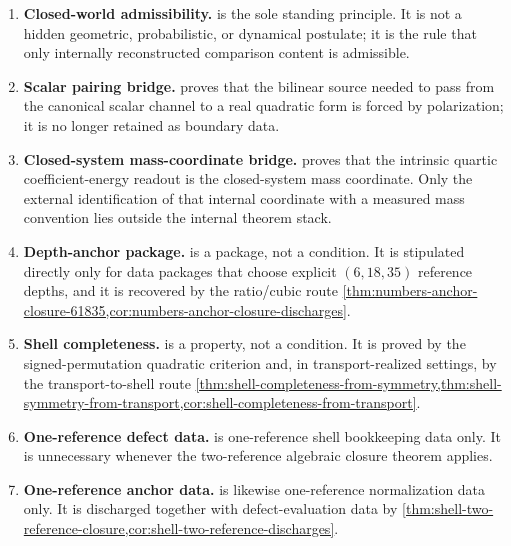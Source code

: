 \begin{enumerate}[label=\textup{(H\arabic*)}]
\item
  \textbf{Closed-world admissibility.}
   is the sole standing principle.  It is not a hidden
  geometric, probabilistic, or dynamical postulate; it is the rule that only
  internally reconstructed comparison content is admissible.
\item
  \textbf{Scalar pairing bridge.}
   proves that the bilinear source needed to pass
  from the canonical scalar channel to a real quadratic form is forced by
  polarization; it is no longer retained as boundary data.
\item
  \textbf{Closed-system mass-coordinate bridge.}
   proves that the intrinsic quartic
  coefficient-energy readout is the closed-system mass coordinate.  Only the
  external identification of that internal coordinate with a measured mass
  convention lies outside the internal theorem stack.
\item
  \textbf{Depth-anchor package.}
   is a package, not a condition.  It is
  stipulated directly only for data packages that choose explicit \((6,18,35)\)
  reference depths, and it is recovered by the ratio/cubic route
  \cref{thm:numbers-anchor-closure-61835,cor:numbers-anchor-closure-discharges}.
\item
  \textbf{Shell completeness.}
   is a property, not a condition.  It is
  proved by the signed-permutation quadratic criterion and, in transport-realized settings,
  by the transport-to-shell route
  \cref{thm:shell-completeness-from-symmetry,thm:shell-symmetry-from-transport,cor:shell-completeness-from-transport}.
\item
  \textbf{One-reference defect data.}
   is one-reference shell bookkeeping
  data only.  It is unnecessary whenever the two-reference algebraic
  closure theorem applies.
\item
  \textbf{One-reference anchor data.}
   is likewise one-reference normalization data
  only.  It is discharged together with defect-evaluation data by
  \cref{thm:shell-two-reference-closure,cor:shell-two-reference-discharges}.
\end{enumerate}

